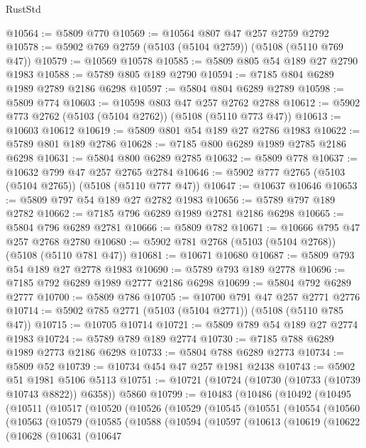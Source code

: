 \begin{lexlean}{RustStd}
\begin{coremodule}
@10564 := @5809 @770
@10569 := @10564 @807 @47 @257 @2759 @2792
@10578 := @5902 @769 @2759 (@5103 (@5104 @2759)) (@5108 (@5110 @769 @47))
@10579 := @10569 @10578
@10585 := @5809 @805 @54 @189 @27 @2790 @1983
@10588 := @5789 @805 @189 @2790
@10594 := @7185 @804 @6289 @1989 @2789 @2186 @6298
@10597 := @5804 @804 @6289 @2789
@10598 := @5809 @774
@10603 := @10598 @803 @47 @257 @2762 @2788
@10612 := @5902 @773 @2762 (@5103 (@5104 @2762)) (@5108 (@5110 @773 @47))
@10613 := @10603 @10612
@10619 := @5809 @801 @54 @189 @27 @2786 @1983
@10622 := @5789 @801 @189 @2786
@10628 := @7185 @800 @6289 @1989 @2785 @2186 @6298
@10631 := @5804 @800 @6289 @2785
@10632 := @5809 @778
@10637 := @10632 @799 @47 @257 @2765 @2784
@10646 := @5902 @777 @2765 (@5103 (@5104 @2765)) (@5108 (@5110 @777 @47))
@10647 := @10637 @10646
@10653 := @5809 @797 @54 @189 @27 @2782 @1983
@10656 := @5789 @797 @189 @2782
@10662 := @7185 @796 @6289 @1989 @2781 @2186 @6298
@10665 := @5804 @796 @6289 @2781
@10666 := @5809 @782
@10671 := @10666 @795 @47 @257 @2768 @2780
@10680 := @5902 @781 @2768 (@5103 (@5104 @2768)) (@5108 (@5110 @781 @47))
@10681 := @10671 @10680
@10687 := @5809 @793 @54 @189 @27 @2778 @1983
@10690 := @5789 @793 @189 @2778
@10696 := @7185 @792 @6289 @1989 @2777 @2186 @6298
@10699 := @5804 @792 @6289 @2777
@10700 := @5809 @786
@10705 := @10700 @791 @47 @257 @2771 @2776
@10714 := @5902 @785 @2771 (@5103 (@5104 @2771)) (@5108 (@5110 @785 @47))
@10715 := @10705 @10714
@10721 := @5809 @789 @54 @189 @27 @2774 @1983
@10724 := @5789 @789 @189 @2774
@10730 := @7185 @788 @6289 @1989 @2773 @2186 @6298
@10733 := @5804 @788 @6289 @2773
@10734 := @5809 @52
@10739 := @10734 @454 @47 @257 @1981 @2438
@10743 := @5902 @51 @1981 @5106 @5113
@10751 := @10721 (@10724 (@10730 (@10733 (@10739 @10743 @8822)) @6358)) @5860
@10799 := @10483
    (@10486
      (@10492
        (@10495
          (@10511
            (@10517
              (@10520
                (@10526
                  (@10529
                    (@10545
                      (@10551
                        (@10554
                          (@10560
                            (@10563
                              (@10579
                                (@10585
                                  (@10588
                                    (@10594
                                      (@10597
                                        (@10613
                                          (@10619
                                            (@10622
                                              (@10628
                                                (@10631
                                                  (@10647

\end{coremodule}
\end{lexlean}
